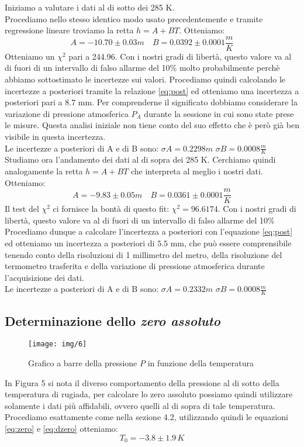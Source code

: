 Iniziamo a valutare i dati al di sotto dei 285 K.\\
Procediamo nello stesso identico modo usato precedentemente e tramite regressione lineare troviamo la retta $h = A+BT$.
Otteniamo:
\[A = -10.70 \pm 0.03 m \quad  B = 0.0392 \pm 0.0001\frac{m}{K}\]
Otteniamo un $\chi^2$ pari a 244.96. 
Con i nostri gradi di libertà, questo valore va al di fuori di un intervallo di falso allarme del 10\% molto probabilmente perchè abbiamo sottostimato le incertezze sui valori.
Procediamo quindi calcolando le incertezze a posteriori tramite la relazione \eqref{eq:post} ed otteniamo una incertezza a posteriori pari a $ 8.7 $ mm. 
Per comprenderne il significato dobbiamo considerare la variazione di pressione atmosferica $P_A$ durante la sessione in cui sono state prese le misure. 
Questa analisi iniziale non tiene conto del suo effetto che è però già ben visibile in questa incertezza.\\
Le incertezze a posteriori di A e di B sono: $\sigma A = 0.2298m$ $\sigma B = 0.0008\frac{m}{K}$
\newline
Studiamo ora l'andamento dei dati al di sopra dei 285 K. 
Cerchiamo quindi analogamente la retta $h = A+BT$ che interpreta al meglio i nostri dati. 
Otteniamo:
\[A = -9.83 \pm 0.05 m \quad  B = 0.0361 \pm 0.0001\frac{m}{K}\]
Il test del $\chi^2$ ci fornisce la bontà di questo fit: $\chi^2 = 96.6174 $. 
Con i nostri gradi di libertà, questo valore va al di fuori di un intervallo di falso allarme del 10\%
Procediamo dunque a calcolare l'incertezza a posteriori con l'equazione \eqref{eq:post} ed otteniamo un incertezza a posteriori di $ 5.5 $ mm, che può essere comprensibile tenendo conto della risoluzioni di 1 millimetro del metro, della risoluzione del termometro trasferita e della variazione di pressione atmosferica durante l'acquisizione dei dati.\\
Le incertezze a posteriori di A e di B sono: $\sigma A = 0.2332m$ $\sigma B = 0.0008\frac{m}{K}$

\subsection{Determinazione dello \emph{zero assoluto}}
\begin{figure}[H]
\centering
\texttt{[image: img/6]}
\caption{Grafico a barre della pressione $P$ in funzione della temperatura}
\end{figure}
In Figura 5 si nota il diverso comportamento della pressione al di sotto della temperatura di rugiada, per calcolare lo zero assoluto possiamo quindi utilizzare solamente i dati più affidabili, ovvero quelli al di sopra di tale temperatura.
Procediamo esattamente come nella sezione 4.2, utilizzando quindi le equazioni \eqref{eq:zero} e \eqref{eq:dzero} otteniamo:
\[T_0 = -3.8 \pm 1.9\, K \]